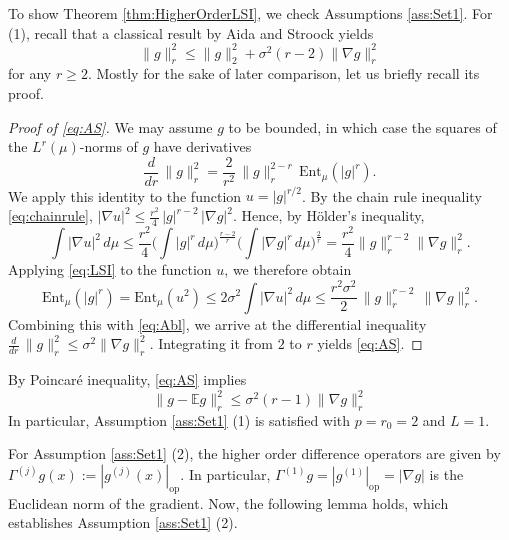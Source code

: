 \documentclass[a4paper,12pt]{amsart}
\numberwithin{equation}{section}
\theoremstyle{remark}
\def\E{{\mathbb E}}
\begin{document}
To show Theorem \ref{thm:HigherOrderLSI}, we check Assumptions \ref{ass:Set1}. For (1), recall that a classical result by Aida and Stroock \cite{AS94} yields
\begin{equation}\label{eq:AS}
	\lVert g \rVert_r^2 \le \lVert g \rVert_2^2 + \sigma^2(r-2) \lVert \nabla g \rVert_r^2
\end{equation}
for any $r \ge 2$. Mostly for the sake of later comparison, let us briefly recall its proof.

\begin{proof}[Proof of \eqref{eq:AS}]
We may assume $g$ to be bounded, in which case the squares of
the $L^r(\mu)$-norms of $g$ have derivatives
\begin{equation}\label{eq:Abl}
	\frac{d}{dr}\, \lVert g \rVert_r^2 = 
	\frac{2}{r^2}\, \lVert g \rVert_r^{2-r}\, \mathrm{Ent}_\mu(|g|^r).
\end{equation}
We apply this identity to the function $u = |g|^{r/2}$. By the chain rule inequality  \eqref{eq:chainrule}, $|\nabla u|^2 \le \frac{r^2}{4}\, |g|^{r-2}\, |\nabla g|^2$.
Hence, by H\"older's inequality,
$$
\int |\nabla u|^2\, d\mu \le 
\frac{r^2}{4} \Big(\int|g|^r\,d\mu\Big)^{\frac{r-2}{r}}
\Big(\int |\nabla g|^r\,d\mu\Big)^{\frac{2}{r}} = 
\frac{r^2}{4} \lVert g \rVert_r^{r-2}\lVert \nabla g \rVert_r^2.
$$
Applying \eqref{eq:LSI} to the function $u$, we therefore obtain
$$
\mathrm{Ent}_\mu (|g|^r) = \text{Ent}_\mu (u^2) \le 
2 \sigma^2 \int |\nabla u|^2\, d\mu \le 
\frac{r^2 \sigma^2}{2}\, \lVert g \rVert_r^{r-2}\, \lVert \nabla g \rVert_r^2.
$$
Combining this with \eqref{eq:Abl}, we arrive at the differential inequality 
$\frac{d}{dr}\, \lVert g \rVert_r^2 \le \sigma^2 \lVert \nabla g \rVert_r^2$. 
Integrating it from $2$ to $r$ yields \eqref{eq:AS}.
\end{proof}

By Poincar\'{e} inequality, \eqref{eq:AS} implies
\begin{equation}\label{eq:1fLSI}
	\lVert g - \E g \rVert_r^2 \le \sigma^2(r-1) \lVert \nabla g \rVert_r^2
\end{equation}
In particular, Assumption \ref{ass:Set1} (1) is satisfied with $p=r_0=2$ and $L=1$.

For Assumption \ref{ass:Set1} (2), the higher order difference operators are given by $\Gamma^{(j)} g(x) := |g^{(j)}(x)|_{\mathrm{op}}$. In particular, $\Gamma^{(1)} g = |g^{(1)}|_{\mathrm{op}} = |\nabla g|$ is the Euclidean norm of the gradient. Now, the following lemma holds, which establishes Assumption \ref{ass:Set1} (2).
\end{document}
